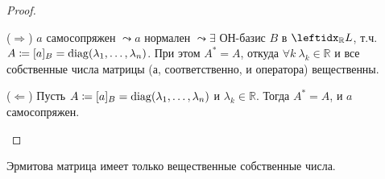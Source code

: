 \begin{proof}
    \begin{proofpart}{($\Rightarrow$)}
        $a$ самосопряжен $\leadsto a$ нормален $\leadsto \exists$ ОН-базис $B$ в $\lsub{\mathbb{R}}{L}$, т.ч. $A \coloneqq [a]_B = \operatorname{diag}(\lambda_1, \dots, \lambda_n)$. При этом $A^* = A$, откуда $\forall k\ \lambda_k \in \mathbb{R}$ и все собственные числа матрицы (а, соответственно, и оператора) вещественны.
    \end{proofpart}
    
    \begin{proofpart}{($\Leftarrow$)}
        Пусть $A \coloneqq [a]_B = \operatorname{diag}(\lambda_1, \dots, \lambda_n)$ и $\lambda_k \in \mathbb{R}$. Тогда $A^* = A$, и $a$ самосопряжен.
    \end{proofpart}
\end{proof}

\begin{cor*}
    Эрмитова матрица имеет только вещественные собственные числа.
\end{cor*}